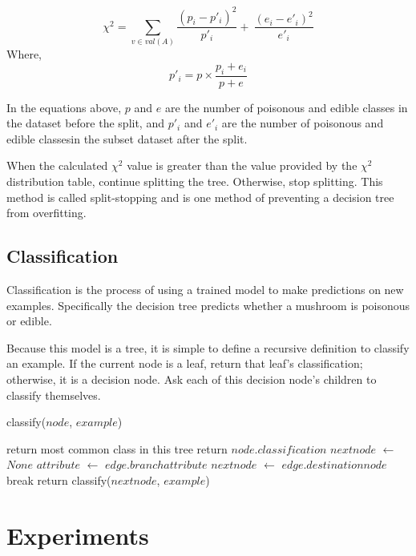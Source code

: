 \documentclass{IEEEtran}
\begin{document}
\begin{equation}
\label{chi-square-equation}
\chi^2 = \sum_{v\in val(A)}\frac{(p_i-p'_i)^2}{p'_i} + \
\frac{(e_i-e'_i)^2}{e'_i}
\end{equation}
Where,
\begin{equation}
\label{chi-square-helper-equation}
p'_i = p \times \frac{p_i+e_i}{p+e}
\end{equation}

In the equations above, $p$ and $e$ are the number of poisonous and
edible classes in the dataset before the split, and $p'_i$ and $e'_i$
are the number of poisonous and edible classesin the subset dataset
after the split. 

When the calculated $\chi^2$ value is greater than the value provided by
the $\chi^2$ distribution table, continue splitting the tree. Otherwise,
stop splitting. This method is called split-stopping and is one method
of preventing a decision tree from overfitting.


\subsection{Classification}
Classification is the process of using a trained model to make
predictions on new examples. Specifically the decision tree predicts
whether a mushroom is poisonous or edible.

Because this model is a tree, it is simple to define a recursive
definition to classify an example. If the current node is a leaf,
return that leaf's classification; otherwise, it is a decision
node. Ask each of this decision node's children to classify themselves.


\begin{algorithm}
\caption{classify($node$, $example$)}
\begin{algorithmic}
\Statex {}
  \State return most common class in this tree
\EndIf
{}
  \State return $node.classification$
\EndIf
\State $nextnode$ $\leftarrow$ $None$
  \State $attribute$ $\leftarrow$ $edge.branchattribute$
    \State $nextnode$ $\leftarrow$ $edge.destinationnode$
    \State break
  \EndIf
\EndFor
\State return classify($nextnode$, $example$)
\end{algorithmic}
\end{algorithm}

\section{Experiments}
\end{document}
